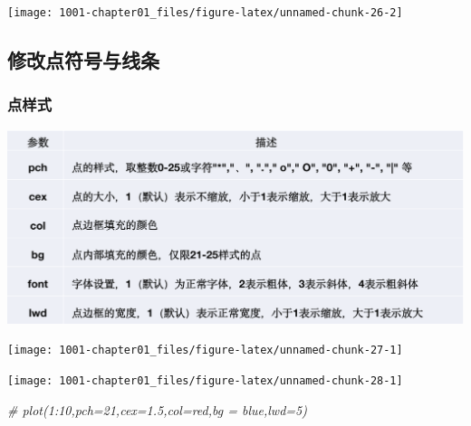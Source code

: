 \documentclass[
]{book}
\newenvironment{Shaded}{\begin{snugshade}}{\end{snugshade}}
\newcommand{\AttributeTok}[1]{\textcolor[rgb]{0.77,0.63,0.00}{#1}}
\newcommand{\CommentTok}[1]{\textcolor[rgb]{0.56,0.35,0.01}{\textit{#1}}}
\newcommand{\DecValTok}[1]{\textcolor[rgb]{0.00,0.00,0.81}{#1}}
\newcommand{\FunctionTok}[1]{\textcolor[rgb]{0.00,0.00,0.00}{#1}}
\newcommand{\NormalTok}[1]{#1}
\newcommand{\SpecialCharTok}[1]{\textcolor[rgb]{0.00,0.00,0.00}{#1}}
\begin{document}
\begin{center}\texttt{[image: 1001-chapter01\_files/figure-latex/unnamed-chunk-26-2]} \end{center}

\hypertarget{ux4feeux6539ux70b9ux7b26ux53f7ux4e0eux7ebfux6761}{%
\subsection{修改点符号与线条}\label{ux4feeux6539ux70b9ux7b26ux53f7ux4e0eux7ebfux6761}}

\hypertarget{ux70b9ux6837ux5f0f}{%
\subsubsection{点样式}\label{ux70b9ux6837ux5f0f}}

\includegraphics{figure/5.jpg}

\begin{center}\texttt{[image: 1001-chapter01\_files/figure-latex/unnamed-chunk-27-1]} \end{center}

\begin{Shaded}
\end{Shaded}

\begin{center}\texttt{[image: 1001-chapter01\_files/figure-latex/unnamed-chunk-28-1]} \end{center}

\begin{Shaded}
\begin{Highlighting}[]
\CommentTok{\# plot(1:10,pch=21,cex=1.5,col=\textquotesingle{}red\textquotesingle{},bg = \textquotesingle{}blue\textquotesingle{},lwd=5)}
\end{Highlighting}
\end{Shaded}
\end{document}
